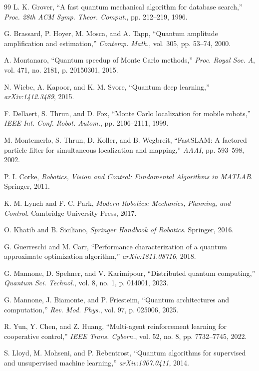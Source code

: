 \documentclass[journal]{IEEEtran}
\begin{document}
\begin{thebibliography}{99}
 L. K. Grover, ``A fast quantum mechanical algorithm for database search,'' \textit{Proc. 28th ACM Symp. Theor. Comput.}, pp. 212--219, 1996.

 G. Brassard, P. Hoyer, M. Mosca, and A. Tapp, ``Quantum amplitude amplification and estimation,'' \textit{Contemp. Math.}, vol. 305, pp. 53--74, 2000.

 A. Montanaro, ``Quantum speedup of Monte Carlo methods,'' \textit{Proc. Royal Soc. A}, vol. 471, no. 2181, p. 20150301, 2015.

 N. Wiebe, A. Kapoor, and K. M. Svore, ``Quantum deep learning,'' \textit{arXiv:1412.3489}, 2015.

 F. Dellaert, S. Thrun, and D. Fox, ``Monte Carlo localization for mobile robots,'' \textit{IEEE Int. Conf. Robot. Autom.}, pp. 2106--2111, 1999.

 M. Montemerlo, S. Thrun, D. Koller, and B. Wegbreit, ``FastSLAM: A factored particle filter for simultaneous localization and mapping,'' \textit{AAAI}, pp. 593--598, 2002.

 P. I. Corke, \textit{Robotics, Vision and Control: Fundamental Algorithms in MATLAB}. Springer, 2011.

 K. M. Lynch and F. C. Park, \textit{Modern Robotics: Mechanics, Planning, and Control}. Cambridge University Press, 2017.

 O. Khatib and B. Siciliano, \textit{Springer Handbook of Robotics}. Springer, 2016.

 G. Guerreschi and M. Carr, ``Performance characterization of a quantum approximate optimization algorithm,'' \textit{arXiv:1811.08716}, 2018.

 G. Mannone, D. Spehner, and V. Karimipour, ``Distributed quantum computing,'' \textit{Quantum Sci. Technol.}, vol. 8, no. 1, p. 014001, 2023.

 G. Mannone, J. Biamonte, and P. Friesteim, ``Quantum architectures and computation,'' \textit{Rev. Mod. Phys.}, vol. 97, p. 025006, 2025.

 R. Yun, Y. Chen, and Z. Huang, ``Multi-agent reinforcement learning for cooperative control,'' \textit{IEEE Trans. Cybern.}, vol. 52, no. 8, pp. 7732--7745, 2022.

 S. Lloyd, M. Mohseni, and P. Rebentrost, ``Quantum algorithms for supervised and unsupervised machine learning,'' \textit{arXiv:1307.0411}, 2014.


\end{thebibliography}
\end{document}
